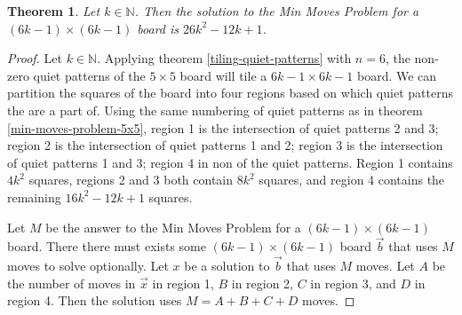 \documentclass[a4paper]{article}
\newtheorem{theorem}{Theorem}
\newcommand{\N}{\mathbb{N}}
\begin{document}
	\begin{theorem}\label{min-moves-problem-6k-1x6k-1}
		Let $k \in \N$.
		Then the solution to the Min Moves Problem for a $(6k - 1) \times (6k - 1)$ board is $26k^2 - 12k + 1$.
	\end{theorem}
	\begin{proof}
		Let $k \in \N$.
		Applying theorem \ref{tiling-quiet-patterns} with $n=6$, the non-zero quiet patterns of the $5 \times 5$ board will tile a $6k - 1 \times 6k - 1$ board.
		We can partition the squares of the board into four regions based on which quiet patterns the are a part of.
		Using the same numbering of quiet patterns as in theorem \ref{min-moves-problem-5x5}, region 1 is the intersection of quiet patterns 2 and 3; region 2 is the intersection of quiet patterns 1 and 2; region 3 is the intersection of quiet patterns 1 and 3; region 4 in non of the quiet patterns.
		Region 1 contains $4k^2$ squares, regions 2 and 3 both contain $8k^2$ squares, and region 4 contains the remaining $16k^2 - 12k + 1$ squares.
		
		Let $M$ be the answer to the Min Moves Problem for a $(6k-1) \times (6k-1)$ board.
		There there must exists some $(6k-1)\times(6k-1)$ board $\vec{b}$ that uses $M$ moves to solve optionally.
		Let $x$ be a solution to $\vec{b}$ that uses $M$ moves.
		Let $A$ be the number of moves in $\vec{x}$ in region 1, $B$ in region 2, $C$ in region 3, and $D$ in region 4.
		Then the solution uses $M = A + B + C + D$ moves.
		

\end{proof}
\end{document}
